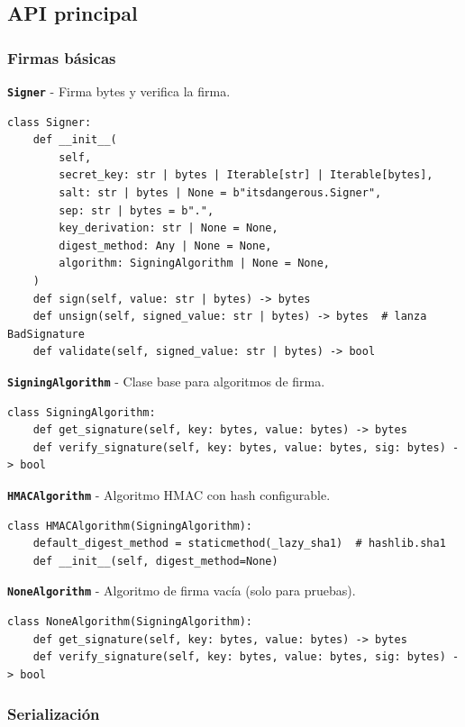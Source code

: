 \documentclass[11pt,a4paper]{article}
\begin{document}
\subsection*{API principal}


\subsubsection*{Firmas básicas}


\textbf{\texttt{Signer}} - Firma bytes y verifica la firma.


\begin{lstlisting}
class Signer:
    def __init__(
        self,
        secret_key: str | bytes | Iterable[str] | Iterable[bytes],
        salt: str | bytes | None = b"itsdangerous.Signer",
        sep: str | bytes = b".",
        key_derivation: str | None = None,
        digest_method: Any | None = None,
        algorithm: SigningAlgorithm | None = None,
    )
    def sign(self, value: str | bytes) -> bytes
    def unsign(self, signed_value: str | bytes) -> bytes  # lanza BadSignature
    def validate(self, signed_value: str | bytes) -> bool
\end{lstlisting}


\textbf{\texttt{SigningAlgorithm}} - Clase base para algoritmos de firma.


\begin{lstlisting}
class SigningAlgorithm:
    def get_signature(self, key: bytes, value: bytes) -> bytes
    def verify_signature(self, key: bytes, value: bytes, sig: bytes) -> bool
\end{lstlisting}


\textbf{\texttt{HMACAlgorithm}} - Algoritmo HMAC con hash configurable.


\begin{lstlisting}
class HMACAlgorithm(SigningAlgorithm):
    default_digest_method = staticmethod(_lazy_sha1)  # hashlib.sha1
    def __init__(self, digest_method=None)
\end{lstlisting}


\textbf{\texttt{NoneAlgorithm}} - Algoritmo de firma vacía (solo para pruebas).


\begin{lstlisting}
class NoneAlgorithm(SigningAlgorithm):
    def get_signature(self, key: bytes, value: bytes) -> bytes
    def verify_signature(self, key: bytes, value: bytes, sig: bytes) -> bool
\end{lstlisting}


\subsubsection*{Serialización}
\end{document}
